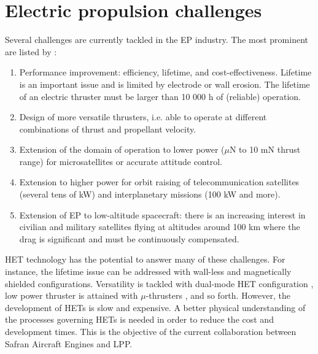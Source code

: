 
\section{Electric propulsion challenges}
\label{sec-challenges}

Several challenges are currently tackled in the \ac{EP} industry.
The most prominent are listed by \citet{samukawa2012}\string:
\begin{enumerate}
  \item Performance improvement\string: efficiency, lifetime, and cost-effectiveness.
   Lifetime is an important issue and is limited by electrode or wall erosion.
   The lifetime of an electric thruster must be larger than 10 000 h of (reliable) operation.
   \item  Design of more versatile thrusters, i.e. able to operate at different combinations of thrust and propellant velocity.
   \item  Extension of the domain of operation to lower power ($\mu$N to 10 mN thrust range) for microsatellites or accurate attitude control.
   \item  Extension to higher power for orbit raising of telecommunication satellites (several tens of kW) and    interplanetary missions (100 kW and more).
   \item Extension of EP to low-altitude spacecraft\string: there is an increasing interest in civilian and military satellites flying  at altitudes around 100 km where the drag is significant and must be continuously compensated.
\end{enumerate}

\ac{HET} technology has the potential to answer many of these challenges.
For instance, the lifetime issue can be addressed with wall-less and magnetically shielded configurations.
Versatility is tackled with dual-mode \ac{HET} configuration \citep{boniface2017}, low power thruster is attained with $\mu$-thrusters \citep{lascombes2018}, and so forth.
However, the development of \ac{HET}s is slow and expensive. 
A better physical understanding of the processes governing \ac{HET}s is needed in order to reduce the cost and development times.
This is the objective of the current collaboration between Safran Aircraft Engines and \ac{LPP}.
